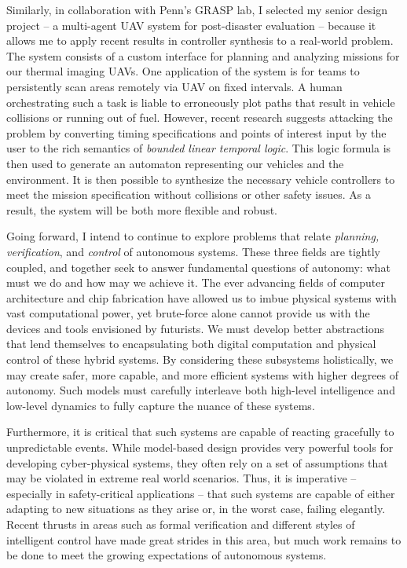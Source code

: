 \documentclass[11pt]{letter}
\begin{document}
Similarly, in collaboration with Penn's GRASP lab, I selected my senior design project -- a multi-agent UAV system for post-disaster evaluation -- because it allows me to apply recent results in controller synthesis to a real-world problem. The system consists of a custom interface for planning and analyzing missions for our thermal imaging UAVs. One application of the system is for teams to persistently scan areas remotely via UAV on fixed intervals. A human orchestrating such a task is liable to erroneously plot paths that result in vehicle collisions or running out of fuel. However, recent research suggests attacking the problem by converting timing specifications and points of interest input by the user to the rich semantics of \emph{bounded linear temporal logic}. This logic formula is then used to generate an automaton representing our vehicles and the environment. It is then possible to synthesize the necessary vehicle controllers to meet the mission specification without collisions or other safety issues. As a result, the system will be both more flexible and robust. 

Going forward, I intend to continue to explore problems that relate \emph{planning, verification}, and \emph{control} of autonomous systems. These three fields are tightly coupled, and together seek to answer fundamental questions of autonomy: what must we do and how may we achieve it. The ever advancing fields of computer architecture and chip fabrication have allowed us to imbue physical systems with vast computational power, yet brute-force alone cannot provide us with the devices and tools envisioned by futurists. We must develop better abstractions that lend themselves to encapsulating both digital computation and physical control of these hybrid systems. By considering these subsystems holistically, we may create safer, more capable, and more efficient systems with higher degrees of autonomy. Such models must carefully interleave both high-level intelligence and low-level dynamics to fully capture the nuance of these systems. 

Furthermore, it is critical that such systems are capable of reacting gracefully to unpredictable events. While model-based design provides very powerful tools for developing cyber-physical systems, they often rely on a set of assumptions that may be violated in extreme real world scenarios. Thus, it is imperative -- especially in safety-critical applications -- that such systems are capable of either adapting to new situations as they arise or, in the worst case, failing elegantly. Recent thrusts in areas such as formal verification and different styles of intelligent control have made great strides in this area, but much work remains to be done to meet the growing expectations of autonomous systems.
\end{document}
